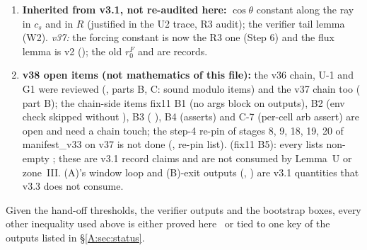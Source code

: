 \documentclass[11pt]{article}
\begin{document}
\begin{enumerate}[label=(G-A\arabic*),leftmargin=3.4em]
\item \textbf{Inherited from v3.1, not re-audited here:} $\cos\theta$ constant along the ray in $c_s$ and in $R$ (justified in the U2 trace, R3 audit); the verifier tail lemma (W2). \emph{v37:} the forcing constant is now the R3 one (Step 6) and the flux lemma is v2 (); the old $r^F_0$ and  are records.
\item \textbf{v38 open items (not mathematics of this file):} the v36 chain, U-1 and G1 were reviewed (, parts B, C: sound modulo items) and the v37 chain too ( part B); the chain-side items fix11 B1 (no args block on  outputs), B2 (env check skipped without ), B3 ( ), B4 (asserts) and C-7 (per-cell arb assert) are open and need a chain touch; the step-4 re-pin of stages 8, 9, 18, 19, 20 of manifest\_v33 on v37 is not done (, re-pin list). \emph{} (fix11 B5): every  lists non-empty ; these are v3.1 record claims and are not consumed by Lemma~U or zone~III. (A)'s window loop and (B)-exit outputs (, ) are v3.1 quantities that v3.3 does not consume.
\end{enumerate}
Given the hand-off thresholds, the verifier outputs and the bootstrap boxes, every other inequality used above is either proved here \tP\ or tied to one key of the outputs listed in \S\ref{A:sec:status}.

\ifdefined\stepmain\else
\end{document}
